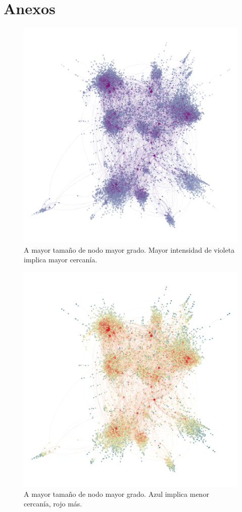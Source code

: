 \section{Anexos}

\begin{figure}[ht]
    \centering
    \includegraphics[width=1\textwidth,angle=90]{img/resultados/grado-cercania.png}
    \caption{A mayor tamaño de nodo mayor grado. Mayor intensidad de violeta implica mayor cercanía.}
\end{figure}

\begin{figure}[ht]
    \centering
    \includegraphics[width=1\textwidth,angle=90]{img/resultados/grado-cercania2.png}
    \caption{A mayor tamaño de nodo mayor grado. Azul implica menor cercanía, rojo más.}
\end{figure}

